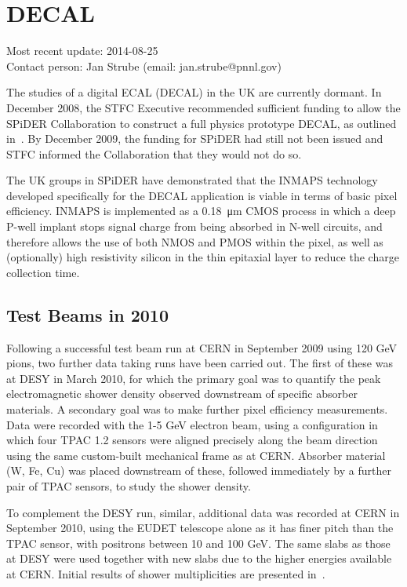\section{DECAL}
Most recent update: 2014-08-25 \\
Contact person: Jan Strube (email: jan.strube@pnnl.gov)

The studies of a digital ECAL (DECAL) in the UK are currently dormant. In December 2008, the STFC Executive recommended sufficient funding
to allow the SPiDER Collaboration to construct a full physics prototype DECAL, as outlined
in~\cite{Adloff:2010aa}. By December 2009, the funding for SPiDER had still not been issued and STFC
informed the Collaboration that they would not do so.

The UK groups in SPiDER have demonstrated that the INMAPS technology developed
specifically for the DECAL application is viable in terms of basic pixel efficiency. INMAPS is
implemented as a \SI{0.18}{\micro\meter} CMOS process in which a deep P-well implant stops signal charge
from being absorbed in N-well circuits, and therefore allows the use of both NMOS and
PMOS within the pixel, as well as (optionally) high resistivity silicon in the thin epitaxial
layer to reduce the charge collection time.

\subsection{Test Beams in 2010}
Following a successful test beam run at CERN in September 2009 using 120 GeV pions, two
further data taking runs have been carried out. The first of these was at DESY in March
2010, for which the primary goal was to quantify the peak electromagnetic shower density
observed downstream of specific absorber materials. A secondary goal was to make further
pixel efficiency measurements. Data were recorded with the 1-5 GeV electron beam, using a
configuration in which four TPAC 1.2 sensors were aligned precisely along the beam direction
using the same custom-built mechanical frame as at CERN. Absorber material (W, Fe, Cu)
was placed downstream of these, followed immediately by a further pair of TPAC sensors, to
study the shower density.

To complement the DESY run, similar, additional data was recorded at CERN in September 2010, using the EUDET telescope alone as it has finer pitch than the TPAC sensor, with positrons between 10 and 100 GeV. The same slabs as those at DESY were used together with
new slabs due to the higher energies available at CERN. Initial results of shower multiplicities
are presented in~\cite{Price:2012vta}.

